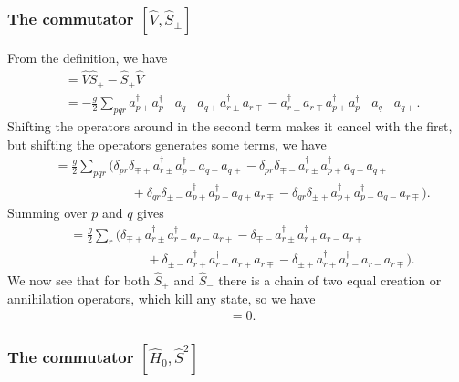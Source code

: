 \documentclass[a4paper, 11pt, notitlepage, english]{article}
\newcommand{\op}[1]{\hat{#1}}
\begin{document}
\subsubsection*{The commutator $[\op{V}, \op{S}_\pm]$}
From the definition, we have
\begin{align*}
[\op{V}, \op{S}_\pm] &= \op{V}\op{S}_\pm - \op{S}_\pm\op{V} \\
&= -\frac{g}{2}\sum_{pqr} a_{p+}^\dagger a_{p-}^\dagger a_{q-} a_{q+} a_{r\pm}^\dagger a_{r\mp} - a_{r\pm}^\dagger a_{r\mp} a_{p+}^\dagger a_{p-}^\dagger a_{q-} a_{q+}.
\end{align*}
Shifting the operators around in the second term makes it cancel with the first, but shifting the operators generates some terms, we have
\begin{align*}
[\op{V}, \op{S}_\pm] &= \frac{g}{2}\sum_{pqr}
\big(\delta_{pr}\delta_{\mp +}  a_{r\pm}^\dagger a_{p-}^\dagger a_{q-} a_{q+}
- \delta_{pr}\delta_{\mp -} a_{r\pm}^\dagger a_{p+}^\dagger a_{q-} a_{q+} \\[-0.2cm]
&\qquad\qquad\qquad + \delta_{qr}\delta_{\pm -} a_{p+}^\dagger   a_{p-}^\dagger a_{q+} a_{r\mp}
- \delta_{qr} \delta_{\pm +}a_{p+}^\dagger   a_{p-}^\dagger a_{q-} a_{r\mp}\big).
\end{align*}
Summing over $p$ and $q$ gives
\begin{align*}
[\op{V}, \op{S}_\pm] &= \frac{g}{2}\sum_{r}
\big(\delta_{\mp +} a_{r\pm}^\dagger a_{r-}^\dagger a_{r-} a_{r+}
- \delta_{\mp -} a_{r\pm}^\dagger a_{r+}^\dagger a_{r-} a_{r+} \\[-0.2cm]
&\qquad\qquad\qquad + \delta_{\pm -} a_{r+}^\dagger   a_{r-}^\dagger a_{r+} a_{r\mp}
-  \delta_{\pm +}a_{r+}^\dagger   a_{r-}^\dagger a_{r-} a_{r\mp}\big).
\end{align*}
We now see that for both $\op{S}_+$ and $\op{S}_-$ there is a chain of two equal creation or annihilation operators, which kill any state, so we have
\begin{align*}
[\op{V}, \op{S}_\pm] &= 0.
\end{align*}


\subsubsection*{The commutator $[\op{H}_0, \op{S}^2]$}
\end{document}
